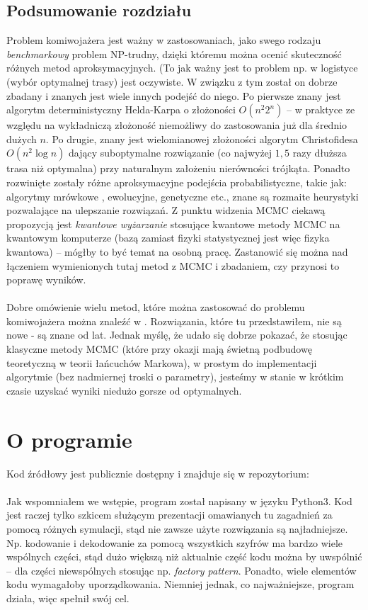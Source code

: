 \documentclass[a4paper]{article}
\theoremstyle{defn}
\theoremstyle{theorem}
\theoremstyle{lemma}
\theoremstyle{cor}
\theoremstyle{fact}
\begin{document}
\subsection{Podsumowanie rozdziału}
Problem komiwojażera jest ważny w zastosowaniach, jako swego rodzaju \textit{benchmarkowy} problem NP-trudny, dzięki któremu można ocenić skuteczność różnych metod aproksymacyjnych. (To jak ważny jest to problem np. w logistyce (wybór optymalnej trasy) jest oczywiste. W związku z tym został on dobrze zbadany i znanych jest wiele innych podejść do niego. Po pierwsze znany jest algorytm deterministyczny Helda-Karpa \cite{heldkarp} o złożoności $O(n^2 2^n)$ – w praktyce ze względu na wykładniczą złożoność niemożliwy do zastosowania już dla średnio dużych $n$. Po drugie, znany jest wielomianowej złożoności algorytm Christofidesa $O(n^2 \log n)$ \cite{christofides} dający suboptymalne rozwiązanie (co najwyżej $1,5$ razy dłuższa trasa niż optymalna) przy naturalnym założeniu nierówności trójkąta. Ponadto rozwinięte zostały różne aproksymacyjne podejścia probabilistyczne, takie jak: algorytmy mrówkowe \cite{mrowki}, ewolucyjne, genetyczne \cite{genetic} etc., znane są rozmaite heurystyki pozwalające na ulepszanie rozwiązań. Z punktu widzenia MCMC ciekawą propozycją jest \textit{kwantowe wyżarzanie} \cite{quantum} stosujące kwantowe metody MCMC na kwantowym komputerze (bazą zamiast fizyki statystycznej jest więc fizyka kwantowa) – mógłby to być temat na osobną pracę. Zastanowić się można nad łączeniem wymienionych tutaj metod z MCMC i zbadaniem, czy przynosi to poprawę wyników.\\\\
Dobre omówienie wielu metod, które można zastosować do problemu komiwojażera można znaleźć w \cite{tsprev}. Rozwiązania, które tu przedstawiłem, nie są nowe - są znane od lat. Jednak myślę, że udało się dobrze pokazać, że stosując klasyczne metody MCMC (które przy okazji mają świetną podbudowę teoretyczną w teorii łańcuchów Markowa), w prostym do implementacji algorytmie (bez nadmiernej troski o parametry), jesteśmy w stanie w krótkim czasie uzyskać wyniki niedużo gorsze od optymalnych.
\newpage
\section{O programie}
Kod źródłowy jest publicznie dostępny i znajduje się w repozytorium: \cite{repo}\\\\
Jak wspomniałem we wstępie, program został napisany w języku Python3.
Kod jest raczej tylko szkicem służącym prezentacji omawianych tu zagadnień za pomocą różnych symulacji, stąd nie zawsze użyte rozwiązania są najładniejsze. Np. kodowanie i dekodowanie za pomocą wszystkich szyfrów ma bardzo wiele wspólnych części, stąd dużo większą niż aktualnie część kodu można by uwspólnić – dla części niewspólnych stosując np. \textit{factory pattern}. Ponadto, wiele elementów kodu wymagałoby uporządkowania. Niemniej jednak, co najważniejsze, program działa, więc spełnił swój cel.
\end{document}
